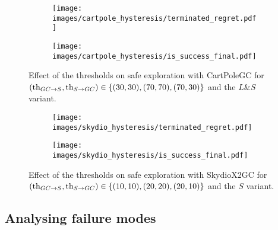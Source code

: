 \begin{figure}[ht]
    \begin{subfigure}{0.22\textwidth}  
        \centering 
        \texttt{[image: images/cartpole\_hysteresis/terminated\_regret.pdf]}
        \caption{}
        \label{fig:cartpole_hysteresis/terminated_regret}
    \end{subfigure}
    \hfill
    \begin{subfigure}{0.22\textwidth}
        \centering
        \texttt{[image: images/cartpole\_hysteresis/is\_success\_final.pdf]}
        \caption{}
        \label{fig:cartpole_hysteresis/is_success_final}
    \end{subfigure}
    \caption{Effect of the thresholds on safe exploration with CartPoleGC for $(\text{th}_{GC \rightarrow S}, \text{th}_{S \rightarrow GC}) \in \{ (30, 30), (70, 70), (70, 30)\}$ and the $L\&S$ variant.}
    \label{fig:cartpole_hysteresis}
\end{figure}

\begin{figure}[ht]
    \begin{subfigure}{0.22\textwidth}  
        \centering 
        \texttt{[image: images/skydio\_hysteresis/terminated\_regret.pdf]}
        \caption{}
        \label{fig:skydio_hysteresis/terminated_regret}
    \end{subfigure}
    \hfill
    \begin{subfigure}{0.22\textwidth}
        \centering
        \texttt{[image: images/skydio\_hysteresis/is\_success\_final.pdf]}
        \caption{}
        \label{fig:skydio_hysteresis/is_success_final}
    \end{subfigure}
    \caption{Effect of the thresholds on safe exploration with SkydioX2GC for $(\text{th}_{GC \rightarrow S}, \text{th}_{S \rightarrow GC}) \in \{ (10, 10), (20, 20), (20, 10)\}$ and the $S$ variant.}
\end{figure}

\subsection{Analysing failure modes}
\label{subsection:analysing failures}


